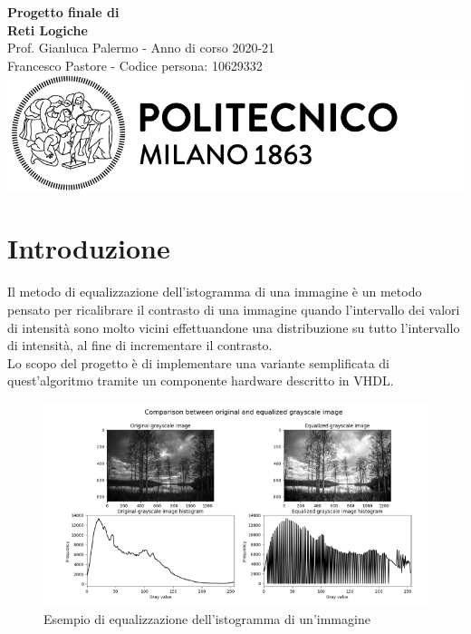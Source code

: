 \documentclass{article}
\begin{document}
\begin{titlepage}
    \centering
    \vspace*{\fill}
    \Huge\textbf{Progetto finale di \\ Reti Logiche}\\
    \vspace{5mm} %
    \Large Prof. Gianluca Palermo - Anno di corso 2020-21\\
    \vspace{5mm} %
    \large Francesco Pastore - Codice persona: 10629332\\
    \vspace{100mm}
    \includegraphics[scale=0.7]{logo.png}
    \vspace*{\fill}
\end{titlepage}

\thispagestyle{empty}
\tableofcontents
\pagebreak
\section{Introduzione}
Il metodo di equalizzazione dell’istogramma di una immagine è un metodo pensato per ricalibrare il contrasto di una immagine quando l’intervallo dei valori di intensità sono molto vicini effettuandone una distribuzione su tutto l’intervallo di intensità, al fine di incrementare il contrasto. \\
Lo scopo del progetto è di implementare una variante semplificata di quest'algoritmo tramite un componente hardware descritto in VHDL.

\begin{figure}[h]
    \includegraphics[width=\textwidth]{equalization.png}
    \centering
    \caption{Esempio di equalizzazione dell'istogramma di un'immagine \cite{equalization}}
\end{figure}
\end{document}
